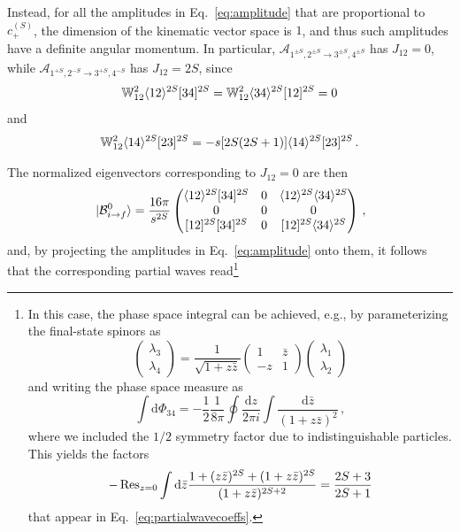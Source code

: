 Instead, for all the amplitudes in Eq.~\eqref{eq:amplitude} that are proportional to $c_+^{(S)}$, the dimension of the kinematic vector space is $1$, and thus such amplitudes have a definite angular momentum.
%
In particular, $\mathcal A_{1^{\pm S},2^{\pm S}\to 3^{\pm S},4^{\pm S}}$ has $J_{12}=0$, while $\mathcal A_{1^{+ S},2^{- S}\to 3^{+ S},4^{- S}}$ has $J_{12}=2S$, since 
%
\begin{equation}
    \mathbb  W^2_{12}\langle 1 2 \rangle^{2S}\lbrack 3 4 \rbrack^{2S} = \mathbb  W^2_{12}\langle 3 4 \rangle^{2S}\lbrack 1 2 \rbrack^{2S}=0
\end{equation}
%
and 
%
\begin{align}
    \mathbb  W^2_{12}\langle 1 4 \rangle^{2S}\lbrack 2 3 \rbrack^{2S} = -s[2S(2S+1)]\langle 1 4 \rangle^{2S}\lbrack 2 3 \rbrack^{2S}\,.
\end{align}

The normalized eigenvectors corresponding to $J_{12}=0$ are then
%
\begin{equation}
    \ket*{\mathcal B_{i\to f}^0} 
    =
    \frac{16\pi}{s^{2S}}
    \begin{pmatrix}
        \langle 1 2 \rangle^{2S}\lbrack 3 4 \rbrack^{2S} & 0 
        & \langle 1 2 \rangle^{2S}\langle 3 4 \rangle^{2S}\\
        0 & 0 
        & 0\\
        \lbrack 1 2 \rbrack^{2S}\lbrack 3 4 \rbrack^{2S} & 0 
        & \lbrack 1 2 \rbrack^{2S}\langle 3 4 \rangle^{2S}
        \end{pmatrix}\,,
\end{equation}
%
and, by projecting the amplitudes in Eq.~\eqref{eq:amplitude} onto them, it follows that the corresponding partial waves read\footnote{
In this case, the phase space integral can be achieved, e.g., by parameterizing the final-state spinors as~\cite{Mastrolia:2009dr,Bresciani:2024shu}
%
\begin{equation}
    \begin{pmatrix}
        \lambda_3 \\ \lambda_4
    \end{pmatrix}
    =
    \frac{1}{\sqrt{1+z\bar z}}
    \begin{pmatrix}
        1 & \bar z \\
        -z & 1
    \end{pmatrix}
    \begin{pmatrix}
        \lambda_1 \\ \lambda_2
    \end{pmatrix}
\end{equation}
and writing the phase space measure as 
\begin{equation}
    \int \text{d}\Phi_{34} =-\frac{1}{2} \frac{1}{8\pi}\oint \frac{\text{d}z}{2\pi i}\int \frac{\text{d}\bar z}{(1+z\bar z)^2}\,,
\end{equation}
%
where we included the $1/2$ symmetry factor due to indistinguishable particles.
This yields the factors
\begin{equation}
    -\Res_{z=0}\int \text{d}\bar z\frac{1+(z\bar z)^{2S}+(1+z\bar z)^{2S}}{(1+z\bar z)^{2S+2}} = \frac{2S+3}{2S+1}
\end{equation}
that appear in Eq.~\eqref{eq:partialwavecoeffs}.}
